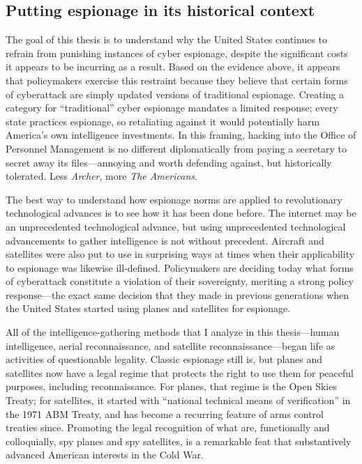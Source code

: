 \documentclass{memoir}
\begin{document}
\begin{refsegment}
\subsection{Putting espionage in its historical context}
The goal of this thesis is to understand why the United States continues to refrain from punishing instances of cyber espionage, despite the significant costs it appears to be incurring as a result. Based on the evidence above, it appears that policymakers exercise this restraint because they believe that certain forms of cyberattack are simply updated versions of traditional espionage. Creating a category for ``traditional'' cyber espionage  mandates a limited response; every state practices espionage, so retaliating against it would potentially harm America's own intelligence investments. In this framing, hacking into the Office of Personnel Management is no different diplomatically from paying a secretary to secret away its files---annoying and worth defending against, but historically tolerated. Less \emph{Archer}, more \emph{The Americans}.

The best way to understand how espionage norms are applied to revolutionary technological advances is to see how it has been done before. The internet may be an unprecedented technological advance, but using unprecedented technological advancements to gather intelligence is not without precedent. Aircraft and satellites were also put to use in surprising ways at times when their applicability to espionage was likewise ill-defined. Policymakers are deciding today what forms of cyberattack constitute a violation of their sovereignty, meriting a strong policy response---the exact same decision that they made in previous generations when the United States started using planes and satellites for espionage.

All of the intelligence-gathering methods that I analyze in this thesis---human intelligence, aerial reconnaissance, and satellite reconnaissance---began life as activities of questionable legality. Classic espionage still is, but planes and satellites now have a legal regime that protects the right to use them for peaceful purposes, including reconnaissance. For planes, that regime is the Open Skies Treaty; for satellites, it started with ``national technical means of verification'' in the 1971 ABM Treaty, and has become a recurring feature of arms control treaties since. Promoting the legal recognition of what are, functionally and colloquially, spy planes and spy satellites, is a remarkable feat that substantively advanced American interests in the Cold War.


\end{refsegment}
\end{document}
